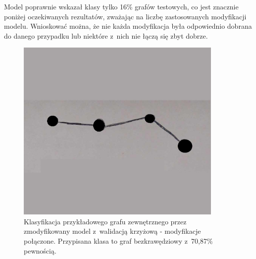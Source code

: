 Model poprawnie wskazał klasy tylko 16\% grafów testowych, co jest znacznie poniżej oczekiwanych rezultatów,
zważając na liczbę zastosowanych modyfikacji modelu.
Wnioskować można, że nie każda modyfikacja była odpowiednio dobrana do danego przypadku
lub niektóre z~nich nie łączą się zbyt dobrze.

\begin{figure}[ht]
	\centering
	\includegraphics[width=10cm]{../graph_classification/test_graphs/drawn/path-3.png}
	\caption{Klasyfikacja przykładowego grafu zewnętrznego przez zmodyfikowany model z~walidacją krzyżową - modyfikacje połączone.
		Przypisana klasa to graf bezkrawędziowy z~70,87\% pewnością.}
	\label{Fig:tests-cv-5d}
\end{figure}
\FloatBarrier